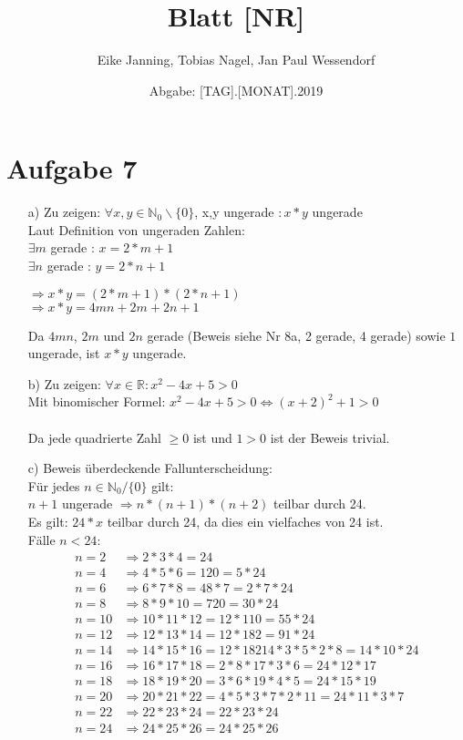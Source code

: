 \documentclass[paper = a4, ngerman]{scrartcl}
\title{Blatt [NR]}
\author{Eike Janning, Tobias Nagel, Jan Paul Wessendorf}
\date{Abgabe: [TAG].[MONAT].2019}
\begin{document}
	\maketitle
	\hrulefill
	
	\section*{Aufgabe 7}
		\begin{itemize}
			\item[a)] Zu zeigen: $\forall x,y \in \mathbb{N}_0 \backslash \{ 0 \}$, x,y ungerade $: x*y$ ungerade\\
			Laut Definition von ungeraden Zahlen:\\
			$\exists m$ gerade : $x = 2*m+1$\\
			$\exists n$ gerade : $y = 2*n+1$
			\begin{center}
				$\Rightarrow x*y = (2*m+1)*(2*n+1)$\\
				$\Rightarrow x*y = 4mn + 2m + 2n + 1$
			\end{center}
			Da $4mn$, $2m$ und $2n$ gerade (Beweis siehe Nr 8a, 2 gerade, 4 gerade) sowie $1$ ungerade, ist $x*y$ ungerade.
			
			\item[b)] Zu zeigen: $\forall x \in \mathbb{R} : x^2 - 4x + 5 > 0$\\
			Mit binomischer Formel: $x^2 - 4x + 5 > 0 \Leftrightarrow (x + 2)^2 + 1 > 0$\\\\
			Da jede quadrierte Zahl $\ge 0$ ist und $1 > 0$ ist der Beweis trivial.
			
			\item[c)]
			Beweis überdeckende Fallunterscheidung:\\
			Für jedes $n \in \mathbb{N}_0 / \{ 0 \}$ gilt:\\
			$n+1$ ungerade $\Rightarrow n*(n+1)*(n+2)$ teilbar durch 24.\\
			Es gilt: $24*x$ teilbar durch 24, da dies ein vielfaches von 24 ist.\\
			Fälle $n<24$:
			\begin{align*}
				n=2 &\Rightarrow 2*3*4 = 24\\
				n=4 &\Rightarrow 4*5*6 = 120 = 5*24\\
				n=6 &\Rightarrow 6*7*8 = 48*7 = 2*7*24\\
				n=8 &\Rightarrow 8*9*10 = 720 = 30*24\\
				n=10 &\Rightarrow 10*11*12 = 12*110 = 55*24\\
				n=12 &\Rightarrow 12*13*14 = 12*182 = 91*24\\
				n=14 &\Rightarrow 14*15*16 = 12*18214*3*5*2*8 = 14*10*24\\
				n=16 &\Rightarrow 16*17*18 = 2*8*17*3*6 = 24*12*17\\
				n=18 &\Rightarrow 18*19*20 = 3*6*19*4*5 = 24*15*19\\
				n=20 &\Rightarrow 20*21*22 = 4*5*3*7*2*11 = 24*11*3*7\\
				n=22 &\Rightarrow 22*23*24 = 22*23*24\\
				n=24 &\Rightarrow 24*25*26 = 24*25*26\\
			\end{align*}
			

\end{itemize}
\end{document}
